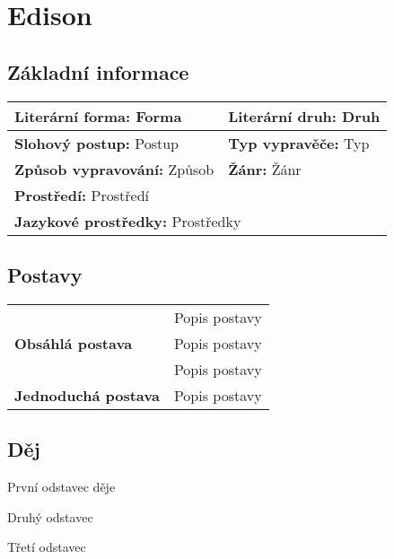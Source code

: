 \section{Edison}
    \subsection*{Základní informace}
        \begin{center}
            \begin{tabular}{l|l}
                \textbf{Literární forma:} Forma & \textbf{Literární druh:} Druh \\
                \hline
                \textbf{Slohový postup:} Postup & \textbf{Typ vypravěče:} Typ \\
                \hline
                \textbf{Způsob vypravování:} Způsob & \textbf{Žánr:} Žánr \\
                \hline
                \multicolumn{2}{l}{\textbf{Prostředí:} Prostředí} \\
                \hline
                \multicolumn{2}{l}{\textbf{Jazykové prostředky:} Prostředky} \\
            \end{tabular}
        \end{center}
    \subsection*{Postavy}
        \begin{center}
            \begin{tabular}{l|l}
                \multirow{3}{15em}{\textbf{Obsáhlá postava}} & Popis postavy \\
                & Popis postavy \\
                & Popis postavy \\
                \hline
                \textbf{Jednoduchá postava} & Popis postavy \\
            \end{tabular}
        \end{center}
    \subsection*{Děj}
        První odstavec děje

        Druhý odstavec
        
        Třetí odstavec

